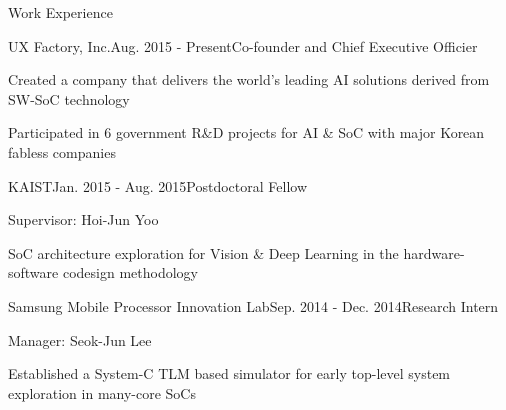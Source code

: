 \documentclass{resume} %
\begin{document}


\makecvheader


\begin{section}{Work Experience}

\begin{subsection}{UX Factory, Inc.}{Aug. 2015 - Present}{Co-founder and Chief Executive Officier}{}
\item Created a company that delivers the world's leading AI solutions derived from SW-SoC technology
\item Participated in 6 government R\&D projects for AI \& SoC with major Korean fabless companies
\end{subsection}
    
\begin{subsection}{KAIST}{Jan. 2015 - Aug. 2015}{Postdoctoral Fellow}{}
\item Supervisor: Hoi-Jun Yoo
\item SoC architecture exploration for Vision \& Deep Learning in the hardware-software codesign methodology
\end{subsection}

\begin{subsection}{Samsung Mobile Processor Innovation Lab}{Sep. 2014 - Dec. 2014}{Research Intern}{}
\item Manager: Seok-Jun Lee
\item Established a System-C TLM based simulator for early top-level system exploration  in many-core SoCs
\end{subsection}

\end{section}

\end{document}
